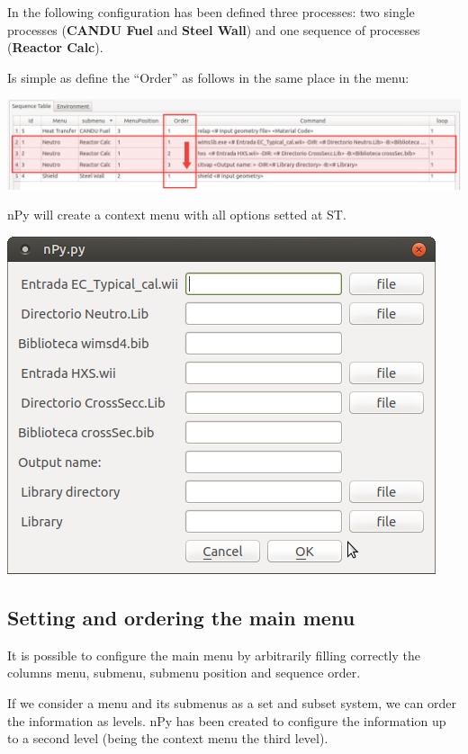 \documentclass[a4paper,10pt]{article}
\begin{document}
In the following configuration has been defined three processes: two single processes (\textbf{CANDU Fuel} and \textbf{Steel Wall}) and one sequence of processes (\textbf{Reactor Calc}).

Is simple as define the ``Order'' as follows in the same place in the menu:

\begin{center}
 \includegraphics[width=\textwidth]{img/orderingSequenceMark.png}
\end{center}

nPy will create a context menu with all options setted at ST.

\begin{center}
 \includegraphics[width=\textwidth]{img/orderingSequenceContextMenu.png}
\end{center}

\subsection{Setting and ordering the main menu}

It is possible to configure the main menu by arbitrarily filling correctly the columns menu, submenu, submenu position and sequence order.

If we consider a menu and its submenus as a set and subset system, we can order the information as levels. nPy has been created to configure the information up to a second level (being the context menu the third level).
\end{document}
